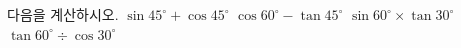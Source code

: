 다음을 계산하시오.
 $\sin 45^\circ+\cos 45^\circ$
 $\cos 60^\circ-\tan 45^\circ$
 $\sin 60^\circ\times\tan 30^\circ$
 $\tan 60^\circ\div\cos 30^\circ$
